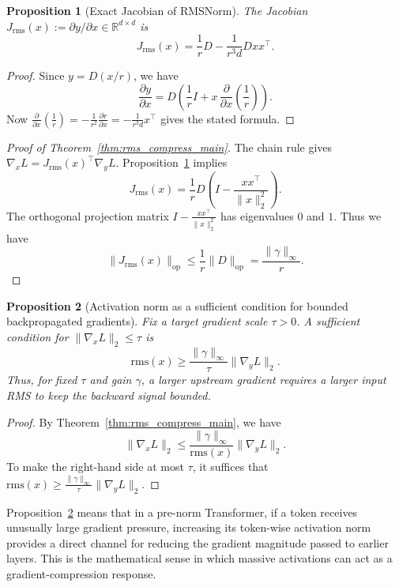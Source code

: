 \documentclass{article}
\theoremstyle{plain}
\newtheorem{proposition}{Proposition}
\theoremstyle{definition}
\theoremstyle{remark}
\begin{document}
\begin{proposition}[Exact Jacobian of RMSNorm]\label{prop:rms-jac-app}
The Jacobian $J_{\mathrm{rms}}(x) := \partial y / \partial x \in \mathbb{R}^{d\times d}$ is
\[
    J_{\mathrm{rms}}(x) = \frac{1}{r}D - \frac{1}{r^3 d} D x x^\top.
\]
\end{proposition}

\begin{proof}
Since $y = D(x/r)$, we have
\[
    \frac{\partial y}{\partial x} = D\left(\frac{1}{r}I + x\,\frac{\partial}{\partial x}\left(\frac{1}{r}\right)\right).
\]
Now $\frac{\partial}{\partial x}\left(\frac{1}{r}\right) = -\frac{1}{r^2}\frac{\partial r}{\partial x} = -\frac{1}{r^3 d}x^\top$ gives the stated formula.
\end{proof}

\begin{proof}[Proof of Theorem~\ref{thm:rms_compress_main}]
The chain rule gives $\nabla_x L = J_{\mathrm{rms}}(x)^\top\nabla_y L$. Proposition~\ref{prop:rms-jac-app} implies
\[
    J_{\mathrm{rms}}(x) = \frac{1}{r}D \left(I - \frac{x x^\top}{\|x\|_2^2}\right).
\]
The orthogonal projection matrix $I - \frac{x x^\top}{\|x\|_2^2}$ has eigenvalues $0$ and $1$. Thus we have
\[
    \|J_{\mathrm{rms}}(x)\|_{\mathrm{op}}
    \le \frac{1}{r}\|D\|_{\mathrm{op}} = \frac{\|\gamma\|_\infty}{r}.
\]
\end{proof}

\begin{proposition}[Activation norm as a sufficient condition for bounded backpropagated gradients]\label{prop:required-rms-app}
Fix a target gradient scale $\tau > 0$. A sufficient condition for $\|\nabla_x L\|_2 \le \tau$ is
\[
    \mathrm{rms}(x) \ge \frac{\|\gamma\|_\infty}{\tau} \|\nabla_y L\|_2.
\]
Thus, for fixed $\tau$ and gain $\gamma$, a larger upstream gradient requires a larger input RMS to keep the backward signal bounded.
\end{proposition}

\begin{proof}
By Theorem~\ref{thm:rms_compress_main}, we have
\[
    \|\nabla_x L\|_2 \le \frac{\|\gamma\|_\infty}{\mathrm{rms}(x)}\|\nabla_y L\|_2.
\]
To make the right-hand side at most $\tau$, it suffices that $\mathrm{rms}(x) \ge \frac{\|\gamma\|_\infty}{\tau} \|\nabla_y L\|_2$.
\end{proof}

Proposition~\ref{prop:required-rms-app} means that in a pre-norm Transformer, if a token receives unusually large gradient pressure, increasing its token-wise activation norm provides a direct channel for reducing the gradient magnitude passed to earlier layers. This is the mathematical sense in which massive activations can act as a gradient-compression response.
\end{document}
